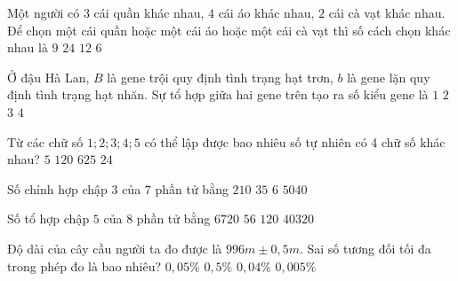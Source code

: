\begin{ex}
Một người có $3$ cái quần khác nhau, $4$ cái áo khác nhau, $2$ cái cà vạt khác nhau. Để chọn một
cái quần hoặc một cái áo hoặc một cái cà vạt thì số cách chọn khác nhau là
\choice
{\True $9$}
{$24$}
{$12$}
{$6$}
\end{ex}
\begin{ex}
Ở đậu Hà Lan, $B$ là gene trội quy định tình trạng hạt trơn, $b$ là gene lặn quy định tình trạng hạt
nhăn. Sự tổ hợp giữa hai gene trên tạo ra số kiểu gene là
\choice
{$1$}
{$2$}
{\True $3$}
{$4$}
\end{ex}
\begin{ex}
Từ các chữ số $1;2;3;4;5$ có thể lập được bao nhiêu số tự nhiên có 4 chữ số khác nhau?
\choice
{$5$}
{\True $120$}
{$625$}
{$24$}
\end{ex}
\begin{ex}
 Số chỉnh hợp chập $3$ của $7$ phần tử bằng
\choice
{\True $210$}
{$35$}
{$6$}
{$5040$}
\end{ex}
\begin{ex}
 Số tổ hợp chập $5$ của $8$ phần tử bằng
\choice
{$6720$}
{\True $56$}
{$120$}
{$40320$}
\end{ex}
\begin{ex}
 Độ dài của cây cầu người ta đo được là $996m\pm 0{,}5m$. Sai số tương đối tối đa trong phép đo là bao nhiêu?
\choice
{\True $0{,}05\%$}
{$0{,}5\%$}
{$0{,}04\%$}
{$0{,}005\%$}
\end{ex}
